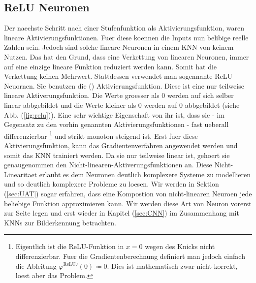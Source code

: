 \cite{wiki:kuenstliches_neuron}
\cite{wiki:perzeptron}


\subsection{ReLU Neuronen}\label{sec:ReLU}
Der naechste Schritt nach einer Stufenfunktion als Aktivierungsfunktion, waren
lineare Aktivierungsfunktionen. Fuer diese koennen die Inputs nun belibige reelle
Zahlen sein.
Jedoch sind solche lineare Neuronen in einem KNN von keinem Nutzen.
Das hat den Grund, dass eine Verkettung von linearen Neuronen,
immer auf eine einzige lineare Funktion reduziert werden kann. Somit hat
die Verkettung keinen Mehrwert.
\para{}
Stattdessen verwendet man sogennante ReLU Neuornen. Sie benutzen die
 () Aktivierungsfunktion.
Diese ist
eine nur teilweise lineare Aktiverungsfunktion. Die Werte groesser als 0 werden
auf sich selber linear abbgebildet und die Werte kleiner als 0 werden auf 0
abbgebildet (siehe Abb. (\ref{fig:relu})).
Eine sehr wichtige Eigenschaft von ihr ist, dass sie - im Gegensatz zu den vorhin
genannten Aktivierungsfunktionen - fast ueberall differenzierbar%
\footnote{%
  Eigentlich ist die ReLU-Funktion in $x=0$ wegen des Knicks nicht
  differenzierbar. Fuer die Gradientenberechnung definiert man jedoch einfach
  die Ableitung $\varphi^{\text{ReLU}}'(0) \coloneqq 0$. Dies ist mathematisch zwar nicht
  korrekt, loest aber das Problem.
}%
und strikt monoton
steigend ist. Erst fuer diese Aktivierungsfunktion, kann das Gradientenverfahren
angewendet werden und somit das KNN trainiert werden.
\para{}
Da sie nur teilweise linear ist, gehoert sie genaugenommen den
Nicht-linearen-Aktiverungsfunktionen an. Diese Nicht-Linearitaet erlaubt es dem
Neuronen deutlich komplexere Systeme zu modellieren und so deutlich komplexere
Probleme zu loesen. Wir werden in Sektion (\ref{sec:UAT}) sogar erfahren, dass
eine Kompostion von nicht-linearen Neuroen jede beliebige Funktion approximieren kann.
\para{}
Wir werden diese Art von Neuron vorerst zur Seite legen und erst wieder in
Kapitel (\ref{sec:CNN}) im Zusammenhang mit KNNs zur Bilderkennung betrachten.
\para{}
